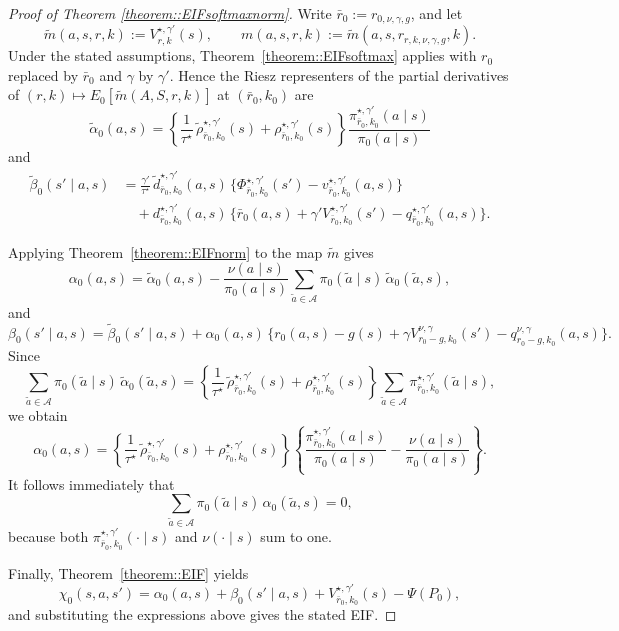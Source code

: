 \documentclass[11pt]{article}
\theoremstyle{plain}
\begin{document}
\begin{proof}[Proof of Theorem \ref{theorem::EIFsoftmaxnorm}]
Write \(\bar r_0 := r_{0,\nu,\gamma,g}\), and let
\[
\tilde m(a,s,r,k) := V_{r,k}^{\star,\gamma'}(s),
\qquad
m(a,s,r,k) := \tilde m(a,s,r_{r,k,\nu,\gamma,g},k).
\]
Under the stated assumptions, Theorem~\ref{theorem::EIFsoftmax} applies with
\(r_0\) replaced by \(\bar r_0\) and \(\gamma\) by \(\gamma'\). Hence the
Riesz representers of the partial derivatives of
\((r,k) \mapsto E_0[\tilde m(A,S,r,k)]\) at \((\bar r_0,k_0)\) are
\[
\tilde\alpha_0(a,s)
= \left\{\frac{1}{\tau^\star}\,\widetilde\rho_{\bar r_0,k_0}^{\star,\gamma'}(s)
+ \rho_{\bar r_0,k_0}^{\star,\gamma'}(s)\right\}
\frac{\pi_{\bar r_0,k_0}^{\star,\gamma'}(a\mid s)}{\pi_0(a\mid s)}
\]
and
\[
\begin{aligned}
\tilde\beta_0(s'\mid a,s)
&= \frac{\gamma'}{\tau^\star}\,
\widetilde d_{\bar r_0,k_0}^{\star,\gamma'}(a,s)\,
\bigl\{\Phi_{\bar r_0,k_0}^{\star,\gamma'}(s')
- v_{\bar r_0,k_0}^{\star,\gamma'}(a,s)\bigr\} \\
&\quad + d_{\bar r_0,k_0}^{\star,\gamma'}(a,s)\,
\bigl\{\bar r_0(a,s) + \gamma' V_{\bar r_0,k_0}^{\star,\gamma'}(s')
- q_{\bar r_0,k_0}^{\star,\gamma'}(a,s)\bigr\}.
\end{aligned}
\]

Applying Theorem~\ref{theorem::EIFnorm} to the map \(\tilde m\) gives
\[
\alpha_0(a,s)
= \tilde\alpha_0(a,s)
- \frac{\nu(a\mid s)}{\pi_0(a\mid s)}
\sum_{\tilde a \in \mathcal{A}} \pi_0(\tilde a\mid s)\,
\tilde\alpha_0(\tilde a,s),
\]
and
\[
\beta_0(s'\mid a,s)
= \tilde\beta_0(s'\mid a,s)
+ \alpha_0(a,s)\,
\bigl\{r_0(a,s) - g(s) + \gamma V_{r_0-g,k_0}^{\nu,\gamma}(s')
- q_{r_0-g,k_0}^{\nu,\gamma}(a,s)\bigr\}.
\]
Since
\[
\sum_{\tilde a \in \mathcal{A}} \pi_0(\tilde a\mid s)\,\tilde\alpha_0(\tilde a,s)
= \left\{\frac{1}{\tau^\star}\,\widetilde\rho_{\bar r_0,k_0}^{\star,\gamma'}(s)
+ \rho_{\bar r_0,k_0}^{\star,\gamma'}(s)\right\}
\sum_{\tilde a \in \mathcal{A}} \pi_{\bar r_0,k_0}^{\star,\gamma'}(\tilde a\mid s),
\]
we obtain
\[
\alpha_0(a,s)
= \left\{\frac{1}{\tau^\star}\,\widetilde\rho_{\bar r_0,k_0}^{\star,\gamma'}(s)
+ \rho_{\bar r_0,k_0}^{\star,\gamma'}(s)\right\}
\left\{\frac{\pi_{\bar r_0,k_0}^{\star,\gamma'}(a\mid s)}{\pi_0(a\mid s)}
- \frac{\nu(a\mid s)}{\pi_0(a\mid s)}\right\}.
\]
It follows immediately that
\[
\sum_{\tilde a \in \mathcal{A}} \pi_0(\tilde a\mid s)\,\alpha_0(\tilde a,s) = 0,
\]
because both \(\pi_{\bar r_0,k_0}^{\star,\gamma'}(\cdot\mid s)\) and
\(\nu(\cdot\mid s)\) sum to one.

Finally, Theorem~\ref{theorem::EIF} yields
\[
\chi_0(s,a,s')
= \alpha_0(a,s) + \beta_0(s'\mid a,s)
+ V_{\bar r_0,k_0}^{\star,\gamma'}(s) - \Psi(P_0),
\]
and substituting the expressions above gives the stated EIF.
\end{proof}
\end{document}
